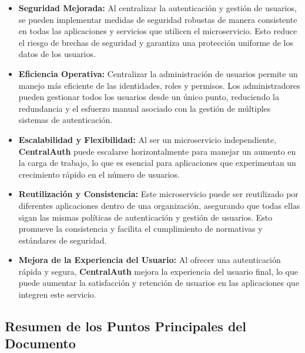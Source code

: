 \documentclass{article}
\begin{document}
\begin{itemize}
    \item \textbf{Seguridad Mejorada:} Al centralizar la autenticación y gestión de usuarios, se pueden implementar medidas de seguridad robustas de manera consistente en todas las aplicaciones y servicios que utilicen el microservicio. Esto reduce el riesgo de brechas de seguridad y garantiza una protección uniforme de los datos de los usuarios.
    \item \textbf{Eficiencia Operativa:} Centralizar la administración de usuarios permite un manejo más eficiente de las identidades, roles y permisos. Los administradores pueden gestionar todos los usuarios desde un único punto, reduciendo la redundancia y el esfuerzo manual asociado con la gestión de múltiples sistemas de autenticación.
    \item \textbf{Escalabilidad y Flexibilidad:} Al ser un microservicio independiente, \textbf{CentralAuth} puede escalarse horizontalmente para manejar un aumento en la carga de trabajo, lo que es esencial para aplicaciones que experimentan un crecimiento rápido en el número de usuarios.
    \item \textbf{Reutilización y Consistencia:} Este microservicio puede ser reutilizado por diferentes aplicaciones dentro de una organización, asegurando que todas ellas sigan las mismas políticas de autenticación y gestión de usuarios. Esto promueve la consistencia y facilita el cumplimiento de normativas y estándares de seguridad.
    \item \textbf{Mejora de la Experiencia del Usuario:} Al ofrecer una autenticación rápida y segura, \textbf{CentralAuth} mejora la experiencia del usuario final, lo que puede aumentar la satisfacción y retención de usuarios en las aplicaciones que integren este servicio.
\end{itemize}

\subsection{Resumen de los Puntos Principales del Documento}
\end{document}
